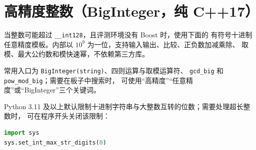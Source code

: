\section{高精度整数（BigInteger，纯 C++17）}

当整数可能超过 \passthrough{\lstinline!__int128!}，且评测环境没有 Boost 时，使用下面的
有符号十进制任意精度模板。内部以 \(10^9\) 为一位，支持输入输出、比较、正负数加减乘除、
取模、最大公约数和模快速幂，不依赖第三方库。

常用入口为 \passthrough{\lstinline!BigInteger(string)!}、四则运算与取模运算符、
\passthrough{\lstinline!gcd_big!} 和 \passthrough{\lstinline!pow_mod_big!}；需要在板子中搜索时，
可使用“高精度”“任意精度”或“BigInteger”三个关键词。

Python 3.11 及以上默认限制十进制字符串与大整数互转的位数；需要处理超长整数时，
可在程序开头关闭该限制：

\begin{lstlisting}[language={Python}]
import sys
sys.set_int_max_str_digits(0)
\end{lstlisting}


